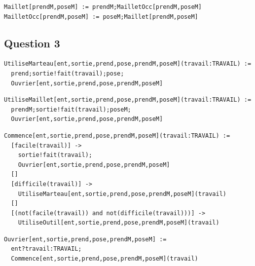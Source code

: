 \documentclass[a4paper,french,12pt]{article}
\begin{document}
\begin{verbatim}
Maillet[prendM,poseM] := prendM;MailletOcc[prendM,poseM]
MailletOcc[prendM,poseM] := poseM;Maillet[prendM,poseM]
\end{verbatim}

\subsection{Question 3}

\begin{verbatim}
UtiliseMarteau[ent,sortie,prend,pose,prendM,poseM](travail:TRAVAIL) :=
  prend;sortie!fait(travail);pose;
  Ouvrier[ent,sortie,prend,pose,prendM,poseM]
\end{verbatim}

\begin{verbatim}
UtiliseMaillet[ent,sortie,prend,pose,prendM,poseM](travail:TRAVAIL) :=
  prendM;sortie!fait(travail);poseM;
  Ouvrier[ent,sortie,prend,pose,prendM,poseM]
\end{verbatim}

\begin{verbatim}
Commence[ent,sortie,prend,pose,prendM,poseM](travail:TRAVAIL) :=
  [facile(travail)] ->
    sortie!fait(travail);
    Ouvrier[ent,sortie,prend,pose,prendM,poseM]
  []
  [difficile(travail)] ->
    UtiliseMarteau[ent,sortie,prend,pose,prendM,poseM](travail)
  []
  [(not(facile(travail)) and not(difficile(travail)))] ->
    UtiliseOutil[ent,sortie,prend,pose,prendM,poseM](travail)
\end{verbatim}

\begin{verbatim}
Ouvrier[ent,sortie,prend,pose,prendM,poseM] :=
  ent?travail:TRAVAIL;
  Commence[ent,sortie,prend,pose,prendM,poseM](travail)
\end{verbatim}
\end{document}
